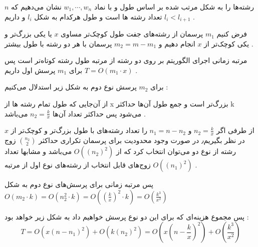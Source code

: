 رشته‌ها را به شکل مرتب شده بر اساس طول و با نماد 
$w_1, \cdots, w_n$
نشان می‌دهیم که 
$n$ 
تعداد رشته ها است و 
طول هرکدام به شکل 
$l_i$
و داریم  
$l_i < l_{i+1}$
.

فرض کنیم 
$m_1$
پرسمان از رشته‌های جفت طول کوچک‌تر مساوی  
$x$
یا 
یکی بزرگ‌تر و یکی کوچک‌تر از 
$x$
انجام دهیم و 
$m_2 = m - m_1$
پرسمان با هر دو رشته با طول بیشتر
.

مرتبه زمانی 
اجرای الگوریتم بر روی دو رشته از مرتبه طول رشته کوتاه‌تر است پس برای 
$m_1$
پرسش اول داریم 
$T = O(m_1 \cdot x)$
.

برای 
$m_2$
پرسش نوع دوم به شکل زیر استدلال می‌کنیم
:

از آن‌جایی که طول تمام رشته ها از 
x
بزرگ‌تر است و
جمع طول آن‌ها حداکثر 
k 
می‌شود پس حداکثر 
تعداد آن‌ها
$n_2 = \frac{k}{x}$
می‌باشد
.

از طرفی
اگر 
$n_2 = \frac{k}{x}$
و 
$n_1 = n - n_2$
را تعداد رشته‌های با طول بزرگ‌تر و کوچک‌تر از 
$x$
در نظر بگیریم٫
در صورت وجود محدودیت برای پرسمان تکراری حداکثر
$n_2\choose 2$
زوج
رشته از نوع دو می‌توان انتخاب کرد
که از 
$O((n_2)^2)$
می‌باشد
و
مشابها تعداد زوج‌های قابل انتخاب از رشته‌های نوع اول 
از مرتبه 
$O((n_1)^2)$
.

پس مرتبه زمانی برای پرسش‌های نوع دوم به شکل 
$O(m_2 \cdot k) = O(n_2^2\cdot k) = O((\frac{k}{x})^2 \cdot k) = O(\frac{k^3}{x^2})$

پس مجموع هزینه‌ای که برای این دو نوع پرسش خواهیم داد به شکل زیر خواهد بود
:
\begin{equation*}
    T = O(x (n-n_1)^2) + O(k(n_2)^2) = O(x (n-\frac{k}{x})^2) + O(\frac{k^3}{x^2})
\end{equation*}
